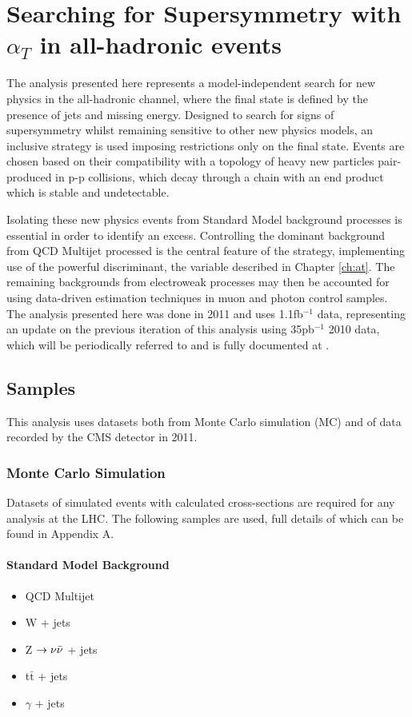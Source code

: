 \chapter{Searching for Supersymmetry with $\alpha_{T}$ in all-hadronic events}
The analysis presented here represents a model-independent search for new physics in the all-hadronic channel, where the final state is defined by the presence of jets and missing energy. Designed to search for signs of supersymmetry whilst remaining sensitive to other new physics models, an inclusive strategy is used imposing restrictions only on the final state. Events are chosen based on their compatibility with a topology of heavy new particles pair-produced in p-p collisions, which decay through a chain with an end product which is stable and undetectable.

Isolating these new physics events from Standard Model background processes is essential in order to identify an excess. Controlling the dominant background from QCD Multijet processed is the central feature of the strategy, implementing use of the powerful discriminant, the \alt variable described in Chapter \ref{ch:at}. The remaining backgrounds from electroweak processes may then be accounted for using data-driven estimation techniques in muon and photon control samples. The analysis presented here was done in 2011 and uses 1.1fb$^{-1}$ data, representing an update on the previous iteration of this analysis using 35pb$^{-1}$ 2010 data, which will be periodically referred to and is fully documented at \cite{35paper}.



\section{Samples}
This analysis uses datasets both from Monte Carlo simulation (MC) and of data recorded by the CMS detector in 2011.

\subsection{Monte Carlo Simulation}
Datasets of simulated events with calculated cross-sections are required for any analysis at the LHC. The following samples are used, full details of which can be found in Appendix A.
\subsubsection{Standard Model Background}
\begin{itemize}
\item QCD Multijet
\item W + jets
\item Z $\rightarrow \nu\bar{\nu}$ + jets
\item t$\bar{\textrm{t}}$ + jets
\item $\gamma$ + jets
\end{itemize}

